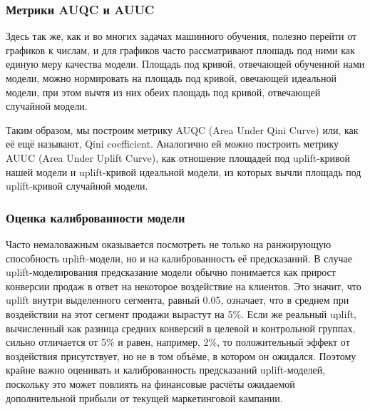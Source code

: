\subsubsection*{Метрики AUQC и AUUC}

Здесь так же, как и во многих задачах машинного обучения, полезно перейти от графиков к числам, и для графиков часто рассматривают плошадь под ними как единую меру качества модели. Площадь под кривой, отвечающей обученной нами модели, можно нормировать на площадь под кривой, овечающей идеальной модели, при этом вычтя из них обеих площадь под кривой, отвечающей случайной модели.

Таким образом, мы построим метрику AUQC (Area Under Qini Curve) или, как её ещё называют, Qini coefficient. Аналогично ей можно построить метрику AUUC (Area Under Uplift Curve), как отношение площадей под uplift-кривой нашей модели и uplift-кривой идеальной модели, из которых вычли площадь под uplift-кривой случайной модели.

\subsubsection*{Оценка калиброванности модели}

Часто немаловажным оказывается посмотреть не только на ранжирующую способность uplift-модели, но и на калиброванность её предсказаний. В случае uplift-моделирования предсказание модели обычно понимается как прирост конверсии продаж в ответ на некоторое воздействие на клиентов. Это значит, что uplift внутри выделенного сегмента, равный 0.05, означает, что в среднем при воздействии на этот сегмент продажи вырастут на 5\%. Если же реальный uplift, вычисленный как разница средних конверсий в целевой и контрольной группах, сильно отличается от 5\% и равен, например, 2\%, то положительный эффект от воздействия присутствует, но не в том объёме, в котором он ожидался. Поэтому крайне важно оценивать и калиброванность предсказаний uplift-моделей, поскольку это может повлиять на финансовые расчёты ожидаемой дополнительной прибыли от текущей маркетинговой кампании.

